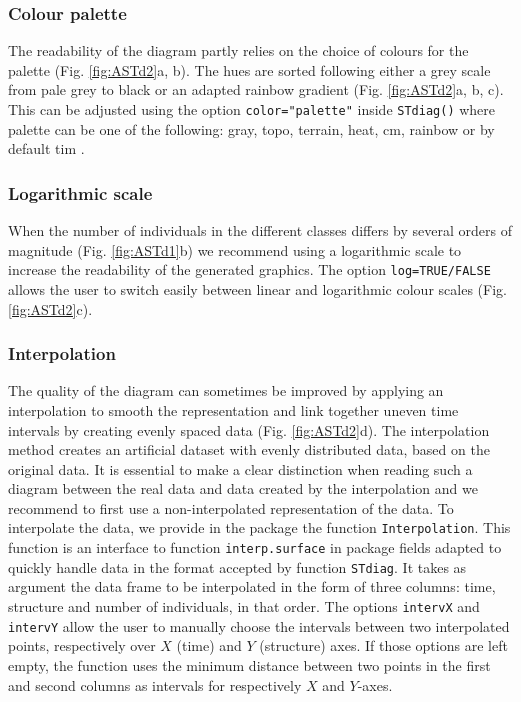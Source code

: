\subsubsection{Colour palette}
The readability of the diagram partly relies on the choice of colours for the
palette (Fig. \ref{fig:ASTd2}a, b). The hues are sorted following either a grey
scale from pale grey to black or an adapted rainbow gradient (Fig.
\ref{fig:ASTd2}a, b, c). This can be adjusted using the option
\texttt{color="palette"} inside \texttt{STdiag()} where palette can be one of
the following: gray, topo, terrain, heat, cm, rainbow or by default tim
\autocites[see tim.colors in library fields,][]{furrer2012a}.

\subsubsection{Logarithmic scale}
When the number of individuals in the different classes differs by several
orders of magnitude (Fig. \ref{fig:ASTd1}b) we recommend using a logarithmic
scale to increase the readability of the generated graphics.
The option \texttt{log=TRUE/FALSE} allows the user to switch easily between
linear and logarithmic colour scales (Fig. \ref{fig:ASTd2}c).

\subsubsection{Interpolation}
The quality of the diagram can sometimes be improved by applying an
interpolation to smooth the representation and link together uneven time
intervals by creating evenly spaced data (Fig. \ref{fig:ASTd2}d). The
interpolation method creates an artificial dataset with evenly distributed data, based on the
original data. It is essential to make a clear distinction when reading such a
diagram between the real data and data created by the interpolation and we
recommend to first use a non-interpolated representation of the data. To
interpolate the data, we provide in the package the function
\texttt{Interpolation}.
This function is an interface to function \texttt{interp.surface} in package
fields adapted to quickly handle data in the format accepted by function
\texttt{STdiag}. It takes as argument the data frame to be interpolated in the
form of three columns: time, structure and number of individuals, in that order.
The options \texttt{intervX} and \texttt{intervY} allow the user to manually
choose the intervals between two interpolated points, respectively over $X$
(time) and $Y$ (structure) axes. If those options are left empty, the function
uses the minimum distance between two points in the first and second columns as
intervals for respectively $X$ and $Y$-axes.

